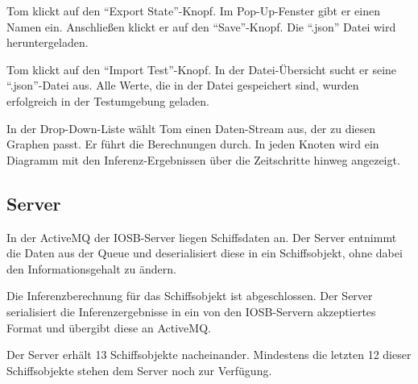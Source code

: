 \documentclass[parskip=full,11pt,twoside]{scrartcl}
\begin{document}
{Tom klickt auf den \enquote{Export State}-Knopf. Im Pop-Up-Fenster gibt er einen Namen ein.
Anschließen klickt er auf den
\enquote{Save}-Knopf.}
{Die \enquote{.json} Datei wird heruntergeladen.}

{Tom klickt auf den \enquote{Import Test}-Knopf. In der Datei-Übersicht sucht er seine \enquote{.json}-Datei aus.}
{Alle Werte, die in der Datei gespeichert sind, wurden erfolgreich in der Testumgebung geladen.}

{In der Drop-Down-Liste wählt Tom einen Daten-Stream aus, der zu diesen Graphen passt.
Er führt die Berechnungen durch.}
{In jeden Knoten wird ein Diagramm mit den Inferenz-Ergebnissen über die Zeitschritte hinweg angezeigt.} %

\subsection{Server}


{In der ActiveMQ der IOSB-Server liegen Schiffsdaten an.}
{Der Server entnimmt die Daten aus der Queue und deserialisiert diese in ein Schiffsobjekt, ohne dabei den Informationsgehalt zu ändern.}

{Die Inferenzberechnung für das Schiffsobjekt ist abgeschlossen.}
{Der Server serialisiert die Inferenzergebnisse in ein von den IOSB-Servern akzeptiertes Format und übergibt diese an ActiveMQ.}

\pagebreak
{}

{Der Server erhält 13 Schiffsobjekte nacheinander.}
{Mindestens die letzten 12 dieser Schiffsobjekte stehen dem Server noch zur Verfügung.}


\end{document}
